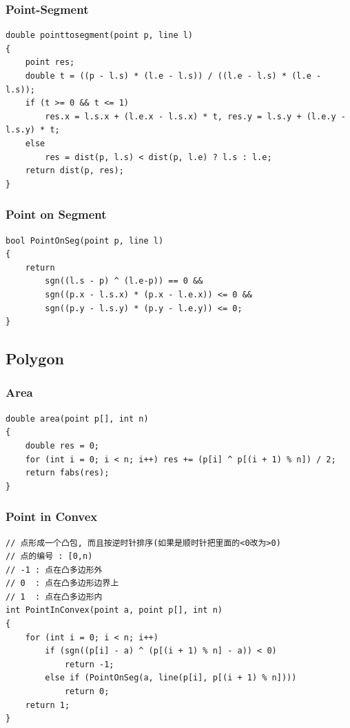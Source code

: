 \documentclass[twoside]{article}
\begin{document}
\subsubsection{Point-Segment}
\begin{lstlisting}
double pointtosegment(point p, line l)
{
    point res;
    double t = ((p - l.s) * (l.e - l.s)) / ((l.e - l.s) * (l.e - l.s));
    if (t >= 0 && t <= 1)
        res.x = l.s.x + (l.e.x - l.s.x) * t, res.y = l.s.y + (l.e.y - l.s.y) * t;
    else
        res = dist(p, l.s) < dist(p, l.e) ? l.s : l.e;
    return dist(p, res);
}
\end{lstlisting}
\subsubsection{Point on Segment}
\begin{lstlisting}
bool PointOnSeg(point p, line l)
{
    return
        sgn((l.s - p) ^ (l.e-p)) == 0 &&
        sgn((p.x - l.s.x) * (p.x - l.e.x)) <= 0 &&
        sgn((p.y - l.s.y) * (p.y - l.e.y)) <= 0;
}
\end{lstlisting}
\subsection{Polygon}
\subsubsection{Area}
\begin{lstlisting}
double area(point p[], int n)
{
    double res = 0;
    for (int i = 0; i < n; i++) res += (p[i] ^ p[(i + 1) % n]) / 2;
    return fabs(res);
}
\end{lstlisting}
\subsubsection{Point in Convex}
\begin{lstlisting}
// 点形成一个凸包, 而且按逆时针排序(如果是顺时针把里面的<0改为>0)
// 点的编号 : [0,n)
// -1 : 点在凸多边形外
// 0  : 点在凸多边形边界上
// 1  : 点在凸多边形内
int PointInConvex(point a, point p[], int n)
{
    for (int i = 0; i < n; i++)
        if (sgn((p[i] - a) ^ (p[(i + 1) % n] - a)) < 0)
            return -1;
        else if (PointOnSeg(a, line(p[i], p[(i + 1) % n])))
            return 0;
    return 1;
}
\end{lstlisting}
\end{document}
